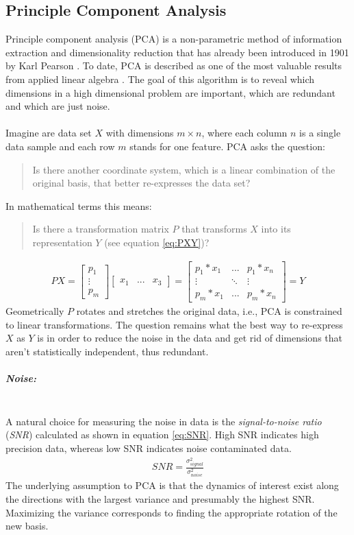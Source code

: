 \subsection{Principle Component Analysis}
\label{subsec:PCA}
Principle component analysis (PCA) is a non-parametric method of information extraction and dimensionality reduction that has already been introduced in 1901 by Karl Pearson \cite{PCA}. To date, PCA is described as one of the most valuable results from applied linear algebra \cite{PCATutorial}. The goal of this algorithm is to reveal which dimensions in a high dimensional problem are important, which are redundant and which are just noise.\\
\\
Imagine are data set $X$ with dimensions $m \times n$, where each column $n$ is a single data sample and each row $m$ stands for one feature. PCA asks the question:
\begin{quote}
Is there another coordinate system, which is a linear combination of the original basis, that better re-expresses the data set?
\end{quote}
In mathematical terms this means: 
\begin{quote}
Is there a transformation matrix $P$ that transforms $X$ into its representation $Y$ (see equation \ref{eq:PXY})?
\end{quote}
\begin{align}
\label{eq:PXY}
PX = \begin{bmatrix} p_1\\ \vdots\\ p_m \end{bmatrix} \begin{bmatrix} x_1 & ... & x_3 \end{bmatrix} = \begin{bmatrix} p_1*x_1 & ... & p_1*x_n\\ \vdots & \ddots & \vdots\\ p_m*x_1 & ... & p_m*x_n \end{bmatrix} = Y
\end{align}
Geometrically $P$ rotates and stretches the original data, i.e., PCA is constrained to linear transformations. The question remains what the best way to re-express $X$ as $Y$ is in order to reduce the noise in the data and get rid of dimensions that aren't statistically independent, thus redundant.

\subparagraph{Noise:}\mbox{}\\
A natural choice for measuring the noise in data is the \textit{signal-to-noise ratio} (\textit{SNR}) calculated as shown in equation \ref{eq:SNR}. High SNR indicates high precision data, whereas low SNR indicates noise contaminated data.
\begin{align}
\label{eq:SNR}
SNR=\frac{\sigma^2_{signal}}{\sigma^2_{noise}}
\end{align}
The underlying assumption to PCA is that the dynamics of interest exist along the directions with the largest variance and presumably the highest SNR. Maximizing the variance corresponds to finding the appropriate rotation of the new basis. 

